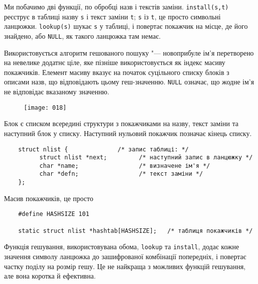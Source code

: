 \documentclass[a4paper,12pt]{book}
\begin{document}
  Ми побачимо дві функції, по обробці назв і текстів заміни. \texttt{install(s,t)}
  реєструє в таблиці назву \texttt{s} і текст заміни \texttt{t}; \texttt{s} із \texttt{t},
  це просто символьні ланцюжки. \texttt{lookup(s)} шукає \texttt{s} у таблиці, і повертає
  покажчик на місце, де його знайдено, або \texttt{NULL}, як такого ланцюжка там немає.

  Використовується алгоритм гешованого пошуку "--- новоприбуле ім'я перетворено на
  невелике додатнє ціле, яке пізніше використовується як індекс масиву покажчиків. Елемент
  масиву вказує на початок суцільного списку блоків з описами назв, що відповідають цьому
  геш-значенню. \texttt{NULL} означає, що жодне ім'я не відповідає вказаному значенню.

  \begin{figure}[!htb]
  \centering
  \texttt{[image: 018]}
  \end{figure}

  Блок є списком всередині структури з покажчиками на назву, текст заміни та
  наступний блок у списку. Наступний нульовий покажчик позначає кінець списку.

  \begin{verbatim}
    struct nlist {              /* запис таблиці: */
          struct nlist *next;         /* наступний запис в ланцюжку */
          char *name;                 /* визначене ім'я */
          char *defn;                 /* текст заміни */
    };
  \end{verbatim}

  Масив покажчиків, це просто
  \begin{verbatim}
    #define HASHSIZE 101

    static struct nlist *hashtab[HASHSIZE];   /* таблиця покажчиків */
  \end{verbatim}

  Функція гешування, використовувана обома, \texttt{lookup} та \texttt{install}, додає
  кожне значення символу ланцюжка до зашифрованої комбінації попередніх, і повертає
  частку поділу на розмір гешу. Це не найкраща з можливих функцій гешування, але вона
  коротка й ефективна.
\end{document}
